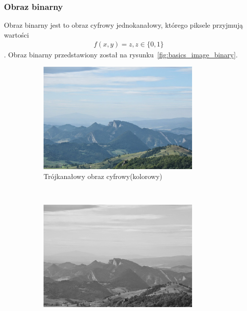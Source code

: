 \subsubsection{Obraz binarny}
Obraz binarny jest to obraz cyfrowy jednokanałowy, którego piksele przyjmują wartości
\begin{gather*}
  f(x, y) = z, z \in \{0, 1\}
\end{gather*}.
Obraz binarny przedstawiony został na rysunku~\ref{fig:basics_image_binary}.
\begin{figure}
  \centering
  \begin{subfigure}[b]{0.3\textwidth}
    \includegraphics[width=\textwidth]{img/basics-image-color}
    \caption{Trójkanałowy obraz cyfrowy(kolorowy)}
    \label{fig:basics_image_color}
  \end{subfigure}
  ~
  \begin{subfigure}[b]{0.3\textwidth}
    \includegraphics[width=\textwidth]{img/basics-image-gray}

\end{subfigure}
\end{figure}
